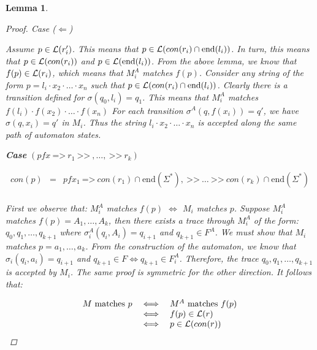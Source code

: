 \documentclass[twocolumn]{sig-alternate-10pt}
\newcommand{\Prefer}{\texttt{>>}}
\newcommand{\Path}{\texttt{=>}}
\newtheorem{lem}[thm]{Lemma}
\begin{document}
\begin{lem}
\begin{proof}
    \vspace{1em}
    Case ($\Leftarrow$)

    Assume $p \in \mathcal{L}(r'_i)$. This means that $p \in \mathcal{L}(con(r_i) \cap \text{end}(l_i))$. In turn, this means that $p \in \mathcal{L}(con(r_i))$ and $p \in \mathcal{L}(\text{end}(l_i))$. From the above lemma, we know that $f(p) \in \mathcal{L}(r_i)$, which means that $M^A_i$ matches $f(p)$. 
    Consider any string of the form $p = l_i \cdot x_2 \cdot \dots \cdot x_n$ such that $p \in \mathcal{L}(con(r_i) \cap \text{end}(l_i))$. Clearly there is a transition defined for $\sigma(q_0,l_i) = q_1$.
    This means that $M^A_i$ matches $f(l_i) \cdot f(x_2) \cdot \dots \cdot f(x_n)$
    For each transition $\sigma^A(q,f(x_i)) = q'$, we have $\sigma(q,x_i) = q'$ in $M_i$.
    Thus the string $l_i \cdot x_2 \cdot \dots \cdot x_n$ is accepted along the same path of automaton states.

  \vspace{1em}

  \textbf{Case} $(pfx ~\Path~ r_1 ~\Prefer~,\dots, ~\Prefer~ r_k)$

    \[ \begin{array}{lcl}
      con(p) &=& pfx_1 ~\Path~ con(r_1) \cap \text{end}(\Sigma^*), ~\Prefer~ \dots ~\Prefer~ con(r_k) \cap \text{end}(\Sigma^*) \\
    \end{array} \]

    First we observe that: $M^A_i$ matches $f(p)$ $\iff$ $M_i$ matches $p$.
    Suppose $M^A_i$ matches $f(p) = A_1, \dots, A_k$, then there exists a trace through $M^A_i$ of the form:%
    $q_0, q_1, \dots, q_{k+1}$
    where $\sigma^A_i(q_i, A_i) = q_{i+1}$ and $q_{k+1} \in F^A$. We must show that $M_i$ matches $p = a_1, \dots, a_k$. %
    From the construction of the automaton, we know that $\sigma_i(q_i, a_i) = q_{i+1}$ and $q_{k+1} \in F \iff q_{k+1} \in F^A_i$. Therefore, the trace $q_0, q_1, \dots, q_{k+1}$ is accepted by $M_i$. 
    The same proof is symmetric for the other direction. It follows that:

    \[ \begin{array}{lll}
      M ~\text{matches}~ p &\iff& M^A ~\text{matches}~ f(p) \\
                         &\iff& f(p) \in \mathcal{L}(r) \\
                         &\iff& p \in \mathcal{L}(con(r)) \\
    \end{array} \]%

  \end{proof}

\end{lem}
\end{document}
